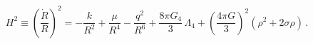 \begin{equation}H^2\equiv \left(\frac{\dot{R}}{R}\right)^2=-\frac{k}{R^2}+
\frac{\mu}{R^4}-\frac{q^2}{R^6}+\frac{8\pi G_4}{3}\,\Lambda_4+
\left(\frac{4\pi G}{3}\right)^2\left(\rho^2+2\sigma \rho\right)\,.
\label{FRW-2}
\end{equation}

